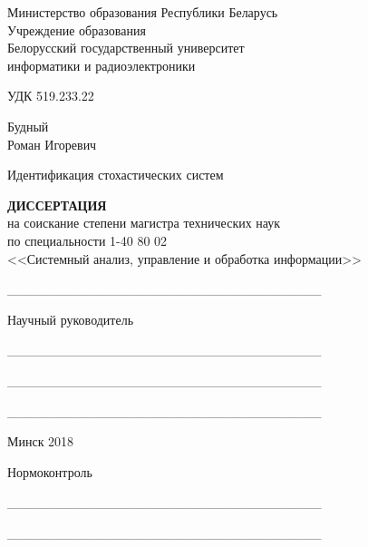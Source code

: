 \setlength{\parindent}{0mm} %
{\centering
  Министерство образования Республики Беларусь \\
  Учреждение образования \\
  Белорусский государственный университет \\
  информатики и радиоэлектроники \\
}

\vspace{2\baselineskip}
УДК 519.233.22

\vspace{\baselineskip}
{\centering
  Будный \\ Роман Игоревич

  \vspace{5\baselineskip}
  Идентификация стохастических систем

  \bigskip
  \textbf{ДИССЕРТАЦИЯ} \\
  на соискание степени магистра технических наук \\
  по специальности 1-40 80 02 \\
  <<Системный анализ, управление и обработка информации>> \\
}

\vspace{2\baselineskip}
\begin{minipage}{.45\linewidth}
\end{minipage}
\hfill
\begin{minipage}{.5\linewidth}
  \_\_\_\_\_\_\_\_\_\_\_\_\_\_\_\_\_\_\_\_\_\_\_\_\_\_\_\_\_\_\_\_\_

  \bigskip
  Научный руководитель

  \smallskip
  \_\_\_\_\_\_\_\_\_\_\_\_\_\_\_\_\_\_\_\_\_\_\_\_\_\_\_\_\_\_\_\_\_

  \smallskip
  \_\_\_\_\_\_\_\_\_\_\_\_\_\_\_\_\_\_\_\_\_\_\_\_\_\_\_\_\_\_\_\_\_

  \smallskip
  \_\_\_\_\_\_\_\_\_\_\_\_\_\_\_\_\_\_\_\_\_\_\_\_\_\_\_\_\_\_\_\_\_
\end{minipage}

\vfill
{\centering Минск 2018 \\}
\thispagestyle{empty}
\pagebreak

\vspace*{18cm}
Нормоконтроль

\smallskip
\_\_\_\_\_\_\_\_\_\_\_\_\_\_\_\_\_\_\_\_\_\_\_\_\_\_\_\_\_\_\_\_\_

\smallskip
\_\_\_\_\_\_\_\_\_\_\_\_\_\_\_\_\_\_\_\_\_\_\_\_\_\_\_\_\_\_\_\_\_

\thispagestyle{empty}
\pagebreak
\setlength{\parindent}{1.25cm} %